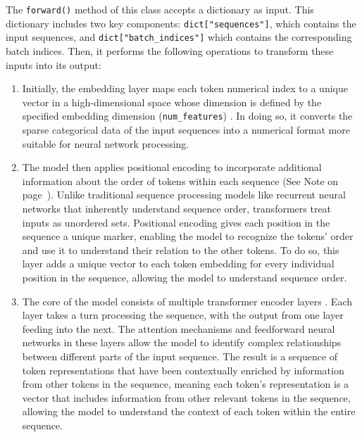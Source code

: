 The \lstinline{forward()} method of this class accepts a dictionary as input. This dictionary  includes two key components: \lstinline{dict["sequences"]}, which contains the input sequences, and \lstinline{dict["batch_indices"]} which contains the corresponding batch indices.
Then, it performs the following operations to transform these inputs into  its output:
\begin{enumerate}
\item %
Initially, the embedding layer maps each token numerical index to a unique vector in a high-dimensional space whose dimension is defined by the specified embedding dimension (\lstinline{num_features}) .
In doing so, it converts the sparse categorical data of the input sequences into a numerical format more suitable for neural network processing.

\item The model then applies positional encoding to incorporate  additional information about the order of tokens within each sequence  (See Note on page~\pageref{note:positionalencoding}). Unlike traditional sequence processing models like recurrent neural networks that inherently understand sequence order, transformers treat inputs as unordered sets. Positional encoding gives each position in the sequence a unique marker, enabling the model to recognize the tokens' order and use it to understand their relation to the other tokens. To do so, this layer adds a unique vector to each token embedding for every individual position in the sequence, allowing the model to understand sequence order. 

\item The core of the model consists of multiple transformer encoder layers . Each layer takes a turn processing the sequence, with the output from one layer feeding into the next. The attention mechanisms and feedforward neural networks in these layers allow the model to identify complex relationships between different parts of the input sequence. The result is a sequence of token representations that have been contextually enriched by information from other tokens in the sequence, meaning each token's representation is a vector that includes information from other relevant tokens in the sequence, allowing the model to understand the context of each token within the entire sequence.


\end{enumerate}
